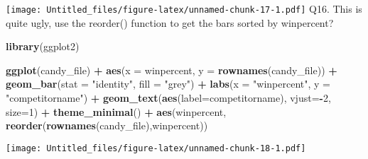 \documentclass[
]{article}
\newenvironment{Shaded}{\begin{snugshade}}{\end{snugshade}}
\newcommand{\AttributeTok}[1]{\textcolor[rgb]{0.13,0.29,0.53}{#1}}
\newcommand{\DecValTok}[1]{\textcolor[rgb]{0.00,0.00,0.81}{#1}}
\newcommand{\FunctionTok}[1]{\textcolor[rgb]{0.13,0.29,0.53}{\textbf{#1}}}
\newcommand{\NormalTok}[1]{#1}
\newcommand{\SpecialCharTok}[1]{\textcolor[rgb]{0.81,0.36,0.00}{\textbf{#1}}}
\newcommand{\StringTok}[1]{\textcolor[rgb]{0.31,0.60,0.02}{#1}}
\begin{document}
\texttt{[image: Untitled\_files/figure-latex/unnamed-chunk-17-1.pdf]}
Q16. This is quite ugly, use the reorder() function to get the bars
sorted by winpercent?

\begin{Shaded}
\begin{Highlighting}[]
\FunctionTok{library}\NormalTok{(ggplot2)}

\FunctionTok{ggplot}\NormalTok{(candy\_file) }\SpecialCharTok{+} 
  \FunctionTok{aes}\NormalTok{(}\AttributeTok{x =}\NormalTok{ winpercent, }\AttributeTok{y =} \FunctionTok{rownames}\NormalTok{(candy\_file)) }\SpecialCharTok{+}
  \FunctionTok{geom\_bar}\NormalTok{(}\AttributeTok{stat =} \StringTok{"identity"}\NormalTok{, }\AttributeTok{fill =} \StringTok{"grey"}\NormalTok{) }\SpecialCharTok{+}
  \FunctionTok{labs}\NormalTok{(}\AttributeTok{x =} \StringTok{"winpercent"}\NormalTok{, }\AttributeTok{y =} \StringTok{"competitorname"}\NormalTok{) }\SpecialCharTok{+}
  \FunctionTok{geom\_text}\NormalTok{(}\FunctionTok{aes}\NormalTok{(}\AttributeTok{label=}\NormalTok{competitorname), }\AttributeTok{vjust=}\SpecialCharTok{{-}}\DecValTok{2}\NormalTok{, }\AttributeTok{size=}\DecValTok{1}\NormalTok{) }\SpecialCharTok{+}
  \FunctionTok{theme\_minimal}\NormalTok{() }\SpecialCharTok{+} \FunctionTok{aes}\NormalTok{(winpercent, }\FunctionTok{reorder}\NormalTok{(}\FunctionTok{rownames}\NormalTok{(candy\_file),winpercent))}
\end{Highlighting}
\end{Shaded}

\texttt{[image: Untitled\_files/figure-latex/unnamed-chunk-18-1.pdf]}
\end{document}

